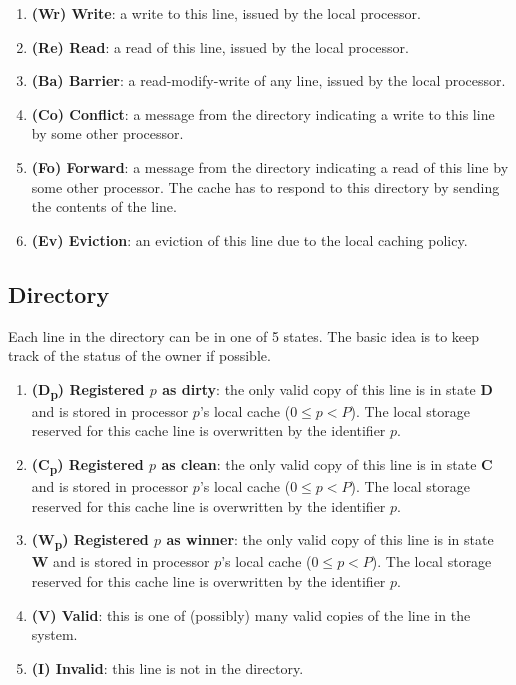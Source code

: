 \documentclass{article}
\begin{document}
\begin{enumerate}
\item \textbf{(Wr) Write}: a write to this line, issued by the local processor.
\item \textbf{(Re) Read}: a read of this line, issued by the local processor.
\item \textbf{(Ba) Barrier}: a read-modify-write of any line, issued by the local processor.
\item \textbf{(Co) Conflict}: a message from the directory indicating a write to this line by some other processor.
\item \textbf{(Fo) Forward}: a message from the directory indicating a read of this line by some other processor. The cache has to respond to this directory by sending the contents of the line.
\item \textbf{(Ev) Eviction}: an eviction of this line due to the local caching policy.
\end{enumerate}

\subsection{Directory}
Each line in the directory can be in one of 5 states. The basic idea is to keep track of the status of the owner if possible.

\begin{enumerate}
\item \textbf{(D\textsubscript{p}) Registered $p$ as dirty}: the only valid copy of this line is in state \textbf{D} and is stored in processor $p$'s local cache ($0 \leq p < P$). The local storage reserved for this cache line is overwritten by the identifier $p$.
\item \textbf{(C\textsubscript{p}) Registered $p$ as clean}: the only valid copy of this line is in state \textbf{C} and is stored in processor $p$'s local cache ($0 \leq p < P$). The local storage reserved for this cache line is overwritten by the identifier $p$.
\item \textbf{(W\textsubscript{p}) Registered $p$ as winner}: the only valid copy of this line is in state \textbf{W} and is stored in processor $p$'s local cache ($0 \leq p < P$). The local storage reserved for this cache line is overwritten by the identifier $p$.
\item \textbf{(V) Valid}: this is one of (possibly) many valid copies of the line in the system.
\item \textbf{(I) Invalid}: this line is not in the directory.
\end{enumerate}
\end{document}
